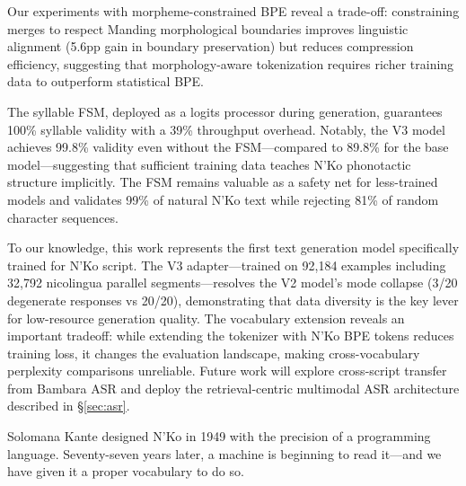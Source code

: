 \documentclass[11pt]{article}
\begin{document}
Our experiments with morpheme-constrained BPE reveal a trade-off: constraining merges to respect Manding morphological boundaries improves linguistic alignment (5.6pp gain in boundary preservation) but reduces compression efficiency, suggesting that morphology-aware tokenization requires richer training data to outperform statistical BPE.

The syllable FSM, deployed as a logits processor during generation, guarantees 100\% syllable validity with a 39\% throughput overhead.
Notably, the V3 model achieves 99.8\% validity even without the FSM---compared to 89.8\% for the base model---suggesting that sufficient training data teaches N'Ko phonotactic structure implicitly.
The FSM remains valuable as a safety net for less-trained models and validates 99\% of natural N'Ko text while rejecting 81\% of random character sequences.

To our knowledge, this work represents the first text generation model specifically trained for N'Ko script.
The V3 adapter---trained on 92,184 examples including 32,792 nicolingua parallel segments---resolves the V2 model's mode collapse (3/20 degenerate responses vs 20/20), demonstrating that data diversity is the key lever for low-resource generation quality.
The vocabulary extension reveals an important tradeoff: while extending the tokenizer with N'Ko BPE tokens reduces training loss, it changes the evaluation landscape, making cross-vocabulary perplexity comparisons unreliable.
Future work will explore cross-script transfer from Bambara ASR and deploy the retrieval-centric multimodal ASR architecture described in \S\ref{sec:asr}.

Solomana Kante designed N'Ko in 1949 with the precision of a programming language.
Seventy-seven years later, a machine is beginning to read it---and we have given it a proper vocabulary to do so.


\end{document}
